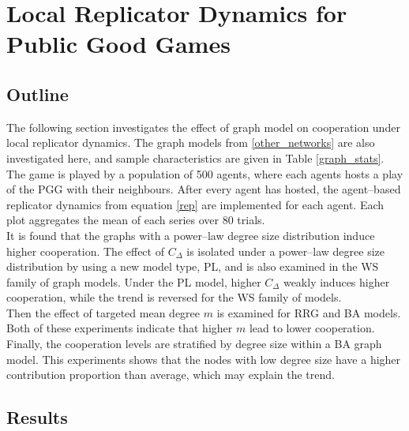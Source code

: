 \section{Local Replicator Dynamics for Public Good Games}
\subsection{Outline}
The following section investigates the effect of graph model on cooperation under local replicator dynamics. The graph models from \ref{other_networks} are also investigated here, and sample characteristics are given in Table \ref{graph_stats}. The game is played by a population of 500 agents, where each agents hosts a play of the PGG with their neighbours. After every agent has hosted, the agent--based replicator dynamics from equation \eqref{rep} are implemented for each agent. Each plot aggregates the mean of each series over 80 trials. \\

It is found that the graphs with a power--law degree size distribution induce higher cooperation. The effect of $C_\Delta$ is isolated under a power--law degree size distribution by using a new model type, PL, and is also examined in the WS family of graph models. Under the PL model, higher $C_\Delta$ weakly induces higher cooperation, while the trend is reversed for the WS family of models. \\

Then the effect of targeted mean degree $m$ is examined for RRG and BA models. Both of these experiments indicate that higher $m$ lead to lower cooperation. Finally, the cooperation levels are stratified by degree size within a BA graph model. This experiments shows that the nodes with low degree size have a higher contribution proportion than average, which may explain the trend. \\

\subsection{Results}
\FloatBarrier
{} 
\FloatBarrier
{}
\FloatBarrier
{}\FloatBarrier

